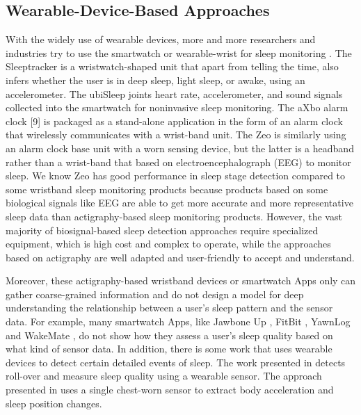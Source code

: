 \subsection{Wearable-Device-Based Approaches}
 With the widely use of wearable devices, more and more researchers and industries try to use the smartwatch or wearable-wrist for sleep monitoring \cite{bain2003evaluation,bonnet2003insomnia,pombo2016ubisleep,caviness1996myoclonus}. The Sleeptracker \cite{sleeptracker} is a wristwatch-shaped unit that apart from telling the time, also infers whether the user is in deep sleep, light sleep, or awake, using an accelerometer. The ubiSleep \cite{pombo2016ubisleep} joints heart rate, accelerometer, and sound signals collected into the smartwatch for noninvasive sleep monitoring. The aXbo alarm clock [9] is packaged as a stand-alone application in the form of an alarm clock that wirelessly communicates with a wrist-band unit. The Zeo \cite{caviness1996myoclonus} is similarly using an alarm clock base unit with a worn sensing device, but the latter is a headband rather than a wrist-band that based on electroencephalograph (EEG) to monitor sleep. We know Zeo has good performance in sleep stage detection compared to some wristband sleep monitoring products because products based on some biological signals like EEG are able to get more accurate and more representative sleep data than actigraphy-based \cite{Actigraphy} sleep monitoring products. However, the vast majority of biosignal-based sleep detection approaches require specialized equipment, which is high cost and complex to operate, while the approaches based on actigraphy are well
adapted and user-friendly to accept and understand.

Moreover, these actigraphy-based wristband devices or smartwatch Apps only can gather coarse-grained information and  do not design a model for deep understanding the relationship between a user's sleep pattern and the sensor data. For example, many smartwatch Apps, like Jawbone Up \cite{Jawbone}, FitBit \cite{fitbit}, YawnLog \cite{YawnLog} and WakeMate \cite{WakeMate}, do not show how they assess a user's sleep quality based on what kind of sensor data. In addition,  there is some work that uses wearable devices to detect certain detailed events of sleep. The work presented in \cite{wear_related2} detects roll-over and measure sleep quality using a wearable sensor. The approach presented in \cite{wear_related3} uses a single chest-worn sensor to extract body acceleration and sleep position changes.


